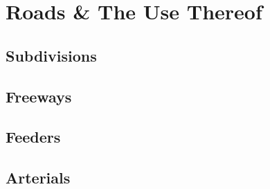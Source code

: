 \chapter{Roads \& The Use Thereof}
\minitoc
\section{Subdivisions}
\section{Freeways}
\section{Feeders}
\section{Arterials}
